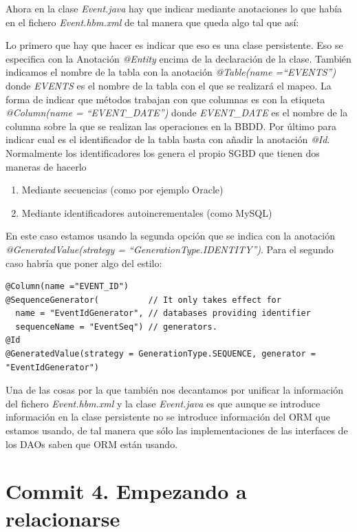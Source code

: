 \documentclass{article}
\begin{document}
	Ahora en la clase \emph{Event.java} hay que indicar mediante anotaciones lo que había en el fichero \emph{Event.hbm.xml} de tal manera que queda algo tal que así:


	Lo primero que hay que hacer es indicar que eso es una clase persistente. Eso se especifica con la Anotación \emph{@Entity} encima de la declaración de la clase. También indicamos el nombre de la tabla con la anotación \emph{@Table(name =``EVENTS'')} donde \emph{EVENTS} es el nombre de la tabla con el que se realizará el mapeo. La forma de indicar que métodos trabajan con que columnas es con la etiqueta \emph{@Column(name = ``EVENT\_DATE'')} donde \emph{EVENT\_DATE} es el nombre de la columna sobre la que se realizan las operaciones en la BBDD. Por último para indicar cual es el identificador de la tabla basta con añadir la anotación \emph{@Id}. Normalmente los identificadores los genera el propio SGBD que tienen dos maneras de hacerlo
{\setlength{\parskip}{0mm}
\begin{enumerate}
	\item Mediante secuencias (como por ejemplo Oracle)
	\item Mediante identificadores autoincrementales (como MySQL)
\end{enumerate}
}

	En este caso estamos usando la segunda opción que se indica con la anotación \emph{@GeneratedValue(strategy = ``GenerationType.IDENTITY'')}. Para el segundo caso habría que poner algo del estilo:
\begin{lstlisting}[style=java]
@Column(name ="EVENT_ID")
@SequenceGenerator(          // It only takes effect for
  name = "EventIdGenerator", // databases providing identifier
  sequenceName = "EventSeq") // generators.
@Id
@GeneratedValue(strategy = GenerationType.SEQUENCE, generator = "EventIdGenerator")
\end{lstlisting}

	Una de las cosas por la que también nos decantamos por unificar la información del fichero \emph{Event.hbm.xml} y la clase \emph{Event.java} es que aunque se introduce información en la clase persistente no se introduce información del ORM que estamos usando, de tal manera que sólo las implementaciones de las interfaces de los DAOs saben que ORM están usando.

\section{Commit 4.  Empezando a relacionarse} \label{sec:c04:Relationship}
\end{document}
